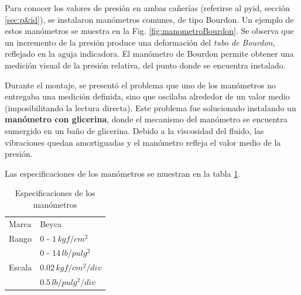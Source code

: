 Para conocer los valores de presión en ambas cañerías
(referirse al \gls{pyid}, sección \ref{sec:p&id}),
se instalaron manómetros comunes, de tipo Bourdon.
Un ejemplo de estos manómetros se muestra en la Fig. \ref{fig:manometroBourdon}.
Se observa que un incremento de la presión produce una deformación
del \emph{tubo de Bourdon}, reflejado en la aguja indicadora.
El manómetro de Bourdon permite obtener una medición visual de la
presión relativa, del punto donde se encuentra instalado.

Durante el montaje, se presentó el problema que uno de los manómetros
no entregaba una medición definida, sino que oscilaba alrededor de un
valor medio (imposibilitando la lectura directa).
Este problema fue solucionado instalando un \textbf{manómetro con glicerina},
donde el mecanismo del manómetro se encuentra sumergido en un baño de glicerina.
Debido a la viscosidad del fluido, las vibraciones quedan amortiguadas
y el manómetro refleja el valor medio de la presión.

Las especificaciones de los manómetros se muestran en la tabla
\ref{tab:EspManoms}.

\begin{table}[t]
\centering
\begin{tabular}{|l|l|}
\hline
Marca & Beyca\\
Rango & $0$ - $1\,kgf/cm^2$\\
 & $0$ - $14\,lb/pulg^2$\\
Escala & $0.02\,kgf/cm^2/div$\\
& $0.5\,lb/pulg^2/div$\\
\hline
\end{tabular}
\caption{Especificaciones de los manómetros}
\label{tab:EspManoms}
\end{table}
